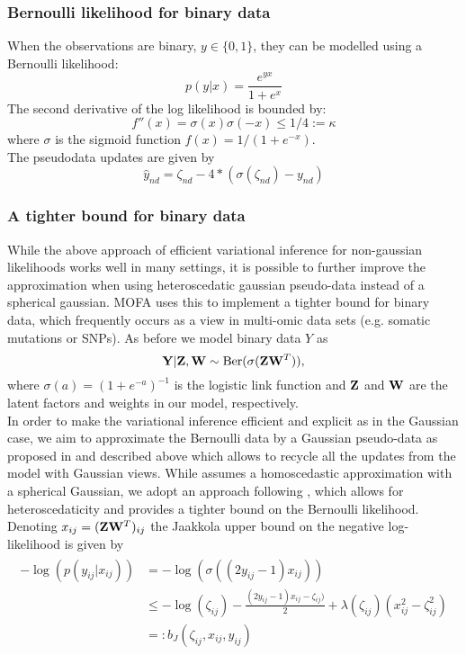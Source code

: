 \documentclass[10pt, a4paper,openany]{report}
\begin{document}
\subsubsection{Bernoulli likelihood for binary data}
When the observations are binary, $y \in \{0,1\}$, they can be modelled using a Bernoulli likelihood:
\[
p(y|x) = \frac{e^{yx}}{1+e^x}
\]
The second derivative of the log likelihood is bounded by:
\[
f''(x) = \sigma(x)\sigma(-x) \leq 1/4 := \kappa
\]
where $\sigma$ is the sigmoid function $f(x) = 1/(1+e^{-x})$.\\
The pseudodata updates are given by
\begin{equation*}
\hat{y}_{nd} = \zeta_{nd} - 4*(\sigma(\zeta_{nd}) - y_{nd})
\end{equation*}


\subsubsection*{A tighter bound for binary data}
While the above approach of efficient variational inference for non-gaussian likelihoods works well in many settings, it is possible to further improve the approximation when using heteroscedatic gaussian pseudo-data instead of a spherical gaussian. MOFA uses this to implement a tighter bound for binary data, which frequently occurs as a view in multi-omic data sets (e.g. somatic mutations or SNPs).
As before we model binary data $Y$ as 
\begin{equation*}
{\bf Y}|{\bf Z},{\bf W} \sim \text{Ber}(\sigma({\bf Z}{\bf W}^T)),
\end{equation*} where $\sigma(a)=(1+e^{-a})^{-1}$ is the logistic link function and ${\bf Z}$ and ${\bf W}$ are the latent factors and weights in our model, respectively.\\
In order to make the variational  inference efficient and explicit as in the Gaussian case, we aim to approximate the Bernoulli data by a Gaussian pseudo-data as proposed in \cite{seeger} and described above which allows to recycle all the updates from the model with Gaussian views. While \cite{seeger} assumes a homoscedastic approximation with a spherical Gaussian, we adopt an approach following \cite{Jaakkola}, which allows for heteroscedaticity and provides a tighter bound on the Bernoulli likelihood.\\
Denoting $x_{ij}=({\bf Z}{\bf W}^T)_{ij}$ the Jaakkola upper bound \cite{Jaakkola} on the negative log-likelihood is given by
\begin{align}
\begin{split}
-\log\left(p(y_{ij}|x_{ij})\right) &= -\log\left(\sigma\left((2y_{ij}-1)  x_{ij}\right)\right)\\
& \leq -\log(\zeta_{ij})-\frac{(2y_{ij}-1)x_{ij}-\zeta_{ij})}{2} +\lambda(\zeta_{ij})\left(x_{ij}^2 -\zeta_{ij}^2 \right)\\
& =: b_J(\zeta_{ij}, x_{ij},y_{ij} )
\label{jaakkola}
\end{split}
\end{align}
\end{document}
